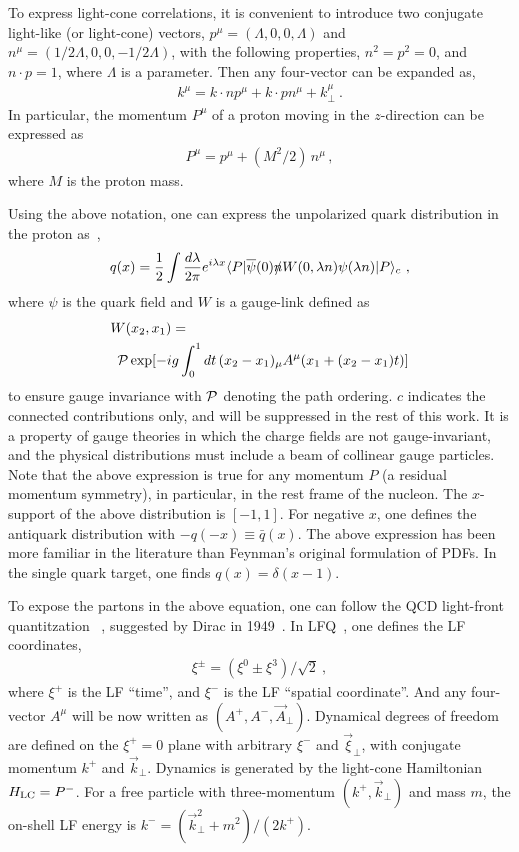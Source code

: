 To express light-cone correlations, it is convenient to introduce
two conjugate light-like (or light-cone) vectors,
$p^\mu=(\Lambda,0,0,\Lambda)$ and $n^\mu=(1/2\Lambda,0,0,-1/2\Lambda)$, with the following properties,
$n^2=p^2=0$, and $n\cdot p=1$, where $\Lambda$ is a parameter. Then any four-vector can be expanded
as,
\begin{align}
	k^\mu = k\cdot n p^\mu + k\cdot p n^\mu  + k_\perp^\mu \ .
\end{align}
In particular, the momentum $P^\mu$ of a proton moving in the $z$-direction can be expressed as
\begin{align}
	P^\mu = p^\mu + (M^2/2)\, n^\mu \,,
\end{align}
where $M$ is the proton mass.

Using the above notation, one can express the unpolarized quark distribution
in the proton as~\cite{Collins:2011zzd},
\begin{align}
	q(x) =\frac{1}{2} \int \frac{d\lambda}{2\pi} e^{i\lambda x}
	\langle P|\overline{\psi}(0) \slashed{n} W(0,\lambda n)\psi(\lambda n)|P\rangle_c \ ,
	\label{eq:LCqPDF}
\end{align}
where $\psi$ is the quark field and $W$ is a gauge-link defined as
\begin{align}
	&W(x_2, x_1)= \nonumber\\
	&\hspace{0.5em}{\cal P}\exp[-ig\int_0^1 dt\,(x_2-x_1)_\mu A^\mu(x_1+(x_2-x_1)t)]
\end{align}
to ensure gauge invariance with ${\cal P}$ denoting the path ordering. $c$ indicates
the connected contributions only, and will be suppressed in the rest of this work.
It is a property of gauge theories in which the charge fields
are not gauge-invariant, and the physical distributions must include a beam of collinear gauge
particles. Note that the above expression is true
for any momentum $P$ (a residual momentum symmetry), in particular,
in the rest frame of the nucleon.
The $x$-support of the above distribution is $[-1,1]$. For negative $x$, one
defines the antiquark distribution with $-q(-x)\equiv \bar q(x)$.
The above expression has been more
familiar in the literature than Feynman's original formulation
of PDFs. In the single quark target, one finds
$q(x)=\delta(x-1)$.

To expose the partons in the above equation, one can follow the QCD light-front quantitzation
~\cite{Chang:1968bh,Kogut:1969xa,Drell:1970yt}, suggested by Dirac in 1949~\cite{Dirac:1949cp}.
In LFQ~\cite{Brodsky:1997de}, one defines the LF coordinates,
\begin{align}
	\xi^\pm = (\xi^0\pm \xi^3)/\sqrt{2} \ ,
\end{align}
where $\xi^+$ is the LF ``time'', and $\xi^-$ is the
LF ``spatial coordinate''. And any four-vector $A^\mu$ will be now written
as $(A^+,A^-,\vec{A}_\perp)$.
Dynamical degrees of freedom are defined on the $\xi^+=0$ plane with
arbitrary $\xi^-$ and $\vec{\xi}_\perp$, with conjugate momentum $k^+$
and $\vec{k}_\perp$. Dynamics is generated
by the light-cone Hamiltonian $H_{\rm LC}=P^-$. For a free particle with
three-momentum $(k^+, \vec{k}_\perp)$ and mass $m$, the {on-shell} LF
energy is $k^-=(\vec{k}_\perp^2+m^2)/(2k^+)$.

